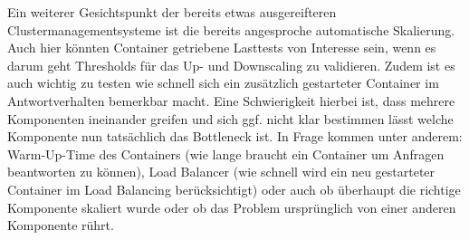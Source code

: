 Ein weiterer Gesichtspunkt der bereits etwas ausgereifteren Clustermanagementsysteme ist die bereits angesproche automatische Skalierung.
Auch hier k\"onnten Container getriebene Lasttests von Interesse sein, wenn es darum geht Thresholds f\"ur das Up- und Downscaling zu validieren.
Zudem ist es auch wichtig zu testen wie schnell sich ein zus\"atzlich gestarteter Container im Antwortverhalten bemerkbar macht.
Eine Schwierigkeit hierbei ist, dass mehrere Komponenten ineinander greifen und sich ggf. nicht klar bestimmen l\"asst welche Komponente nun tats\"achlich das \glqq{}Bottleneck\grqq{} ist. In Frage kommen unter anderem: Warm-Up-Time des Containers (wie lange braucht ein Container um Anfragen beantworten zu k\"onnen), Load Balancer (wie schnell wird ein neu gestarteter Container im Load Balancing ber\"ucksichtigt) oder auch ob \"uberhaupt die richtige Komponente skaliert wurde oder ob das Problem urspr\"unglich von einer anderen Komponente r\"uhrt.
